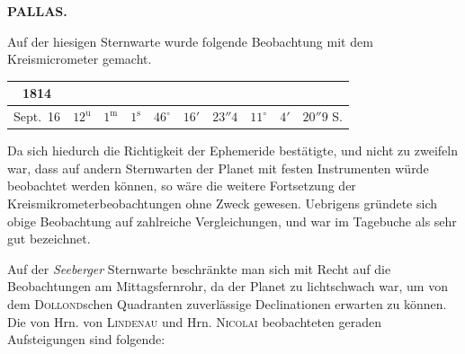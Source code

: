 \clearpage
\thispagestyle{empty}
\noindent{}%
%
\parbox[t]{\dimexpr\linewidth-24mm\relax}{\centering\footnotesize\bfseries PALLAS.\par}%
\makebox[12mm][r]{}\par\nobreak\medskip
\par\indent Auf der hiesigen Sternwarte wurde folgende Beobachtung mit dem Kreismicrometer gemacht.

\begin{center}\fontsize{9}{11}\selectfont\setlength{\tabcolsep}{3pt}\renewcommand{\arraystretch}{1.15}\begin{tabular}{c|ccc|ccc|ccc}
1814 &  &  &  \\
\hline
Sept.\ 16 & $12^{\mathrm u}$ & $1^{\mathrm m}$ & $1^{\mathrm s}$ & $46^{\circ}$ & $16'$ & $23''4$ & $11^{\circ}$ & $4'$ & $20''9$ S. \\
\end{tabular}\end{center}

\par\indent Da sich hiedurch die Richtigkeit der Ephemeride bestätigte, und nicht zu zweifeln war, dass
auf andern Sternwarten der Planet mit festen Instrumenten würde beobachtet werden können, so
wäre die weitere Fortsetzung der Kreismikrometerbeobachtungen ohne Zweck gewesen. Uebrigens
gründete sich obige Beobachtung auf zahlreiche Vergleichungen, und war im Tagebuche als sehr
gut bezeichnet.

\par\indent Auf der \emph{Seeberger} Sternwarte beschränkte man sich mit Recht auf die Beobachtungen am
Mittagsfernrohr, da der Planet zu lichtschwach war, um von dem \textsc{Dollond}schen Quadranten
zuverlässige Declinationen erwarten zu können. Die von Hrn. von \textsc{Lindenau} und Hrn.
\textsc{Nicolai} beobachteten geraden Aufsteigungen sind folgende:

